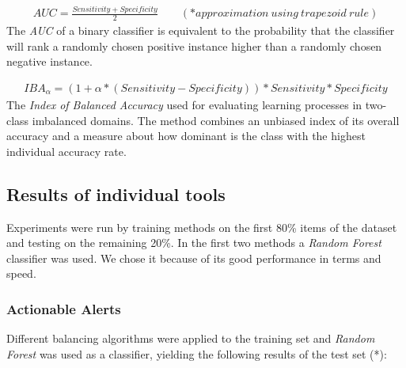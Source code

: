 \begin{gather*}
AUC = \frac{Sensitivity + Specificity}{2} \qquad (*approximation \ using \ trapezoid \ rule)
\end{gather*} 
The \textit{AUC} of a binary classifier is equivalent to the probability that the classifier will rank a randomly chosen positive instance higher than a randomly chosen negative instance.


\begin{gather*}
IBA_{\alpha} = (1 + \alpha * (Sensitivity - Specificity)) * Sensitivity * Specificity
\end{gather*} 
The \textit{Index of Balanced Accuracy} used for evaluating learning processes in two-class imbalanced domains. The
method combines an unbiased index of its overall accuracy and a measure about
how dominant is the class with the highest individual accuracy rate.



\subsection{Results of individual tools}

Experiments were run by training methods on the first 80\% items of the dataset and testing on the remaining 20\%. In the first two methods a \textit{Random Forest} classifier was used. We chose it because of its good performance in terms and speed.

\subsubsection{Actionable Alerts}

Different balancing algorithms were applied to the training set and \textit{Random Forest} was used as a classifier, yielding the following results of the test set (*):

